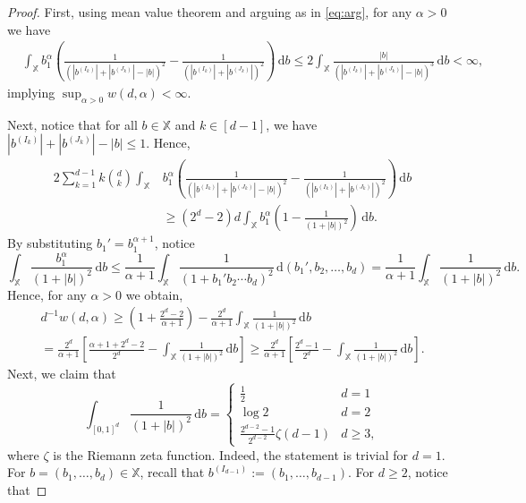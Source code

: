\documentclass[11pt,reqno]{amsart}
\numberwithin{equation}{section}
\theoremstyle{definition}
\newcommand{\XX}{\mathbb{X}}
\newcommand{\diff}{{\,\mathrm d}}
\begin{document}
\begin{proof} First, using mean value theorem and arguing as in \eqref{eq:arg}, for any $\alpha>0$ we have
	\begin{align*}
		&\int_{\XX } b_1^{\alpha} \left(\frac{1}{(|b^{(I_k)}| + |b^{(J_k)}|-|b|)^{2}}  - \frac{1}{(|b^{(I_k)}| + |b^{(J_k)}|)^{2}}\right)\diff b \le 2 \int_{\XX }\frac{|b|}{(|b^{(I_k)}| + |b^{(J_k)}|-|b|)^{3}}\diff b <\infty,
	\end{align*}
	implying $\sup_{\alpha>0} w(d,\alpha)<\infty.$
	
	Next, notice that for all $b \in \XX$ and $k \in [d-1]$, we have $|b^{(I_k)}| + |b^{(J_k)}|-|b| \le 1$. Hence, 
	\begin{align*}
		2\sum_{k=1}^{d-1} k\binom{d}{k}\int_{\XX } & b_1^{\alpha} \left(\frac{1}{(|b^{(I_k)}| + |b^{(J_k)}|-|b|)^{2}}  - \frac{1}{(|b^{(I_k)}| + |b^{(J_k)}|)^{2}}\right)\diff b\\
		&\ge (2^d-2) d \int_{\XX }b_1^{\alpha} \left(1  - \frac{1}{(1+|b|)^{2}}\right)\diff b.
	\end{align*}
By substituting $b_1'=b_1^{\alpha +1}$, notice 
	$$
	\int_{\XX} \frac{b_1^{\alpha}}{(1+|b|)^{2}} \diff b \le \frac{1}{\alpha+1} \int_{\XX} \frac{1}{(1+b_1' b_2 \cdots b_d)^{2}} \diff (b_1',b_2,\dots,b_d)=	\frac{1}{\alpha+1}\int_{\XX} \frac{1}{(1+|b|)^{2}} \diff b.
	$$
	Hence, for any $\alpha>0$ we obtain,
	\begin{multline}\label{eq:sim}
		d^{-1}w(d,\alpha) \ge \left(1 + \frac{2^d-2}{\alpha+1}\right) - \frac{2^d}{\alpha+1} \int_{\XX} \frac{1}{(1+|b|)^2} \diff b \\
= \frac{2^d}{\alpha+1} \left[ \frac{\alpha +1+2^d-2}{2^d} - \int_{\XX} \frac{1}{(1+|b|)^2} \diff b\right]
 \ge \frac{2^d}{\alpha+1} \left[ \frac{2^d-1}{2^d} - \int_{\XX} \frac{1}{(1+|b|)^2} \diff b\right].
	\end{multline}
	Next, we claim that
	\begin{equation}\label{eq:sqint}
		\int_{[0,1]^d} \frac{1}{(1+|b|)^2} \diff b = \left\{
		\begin{array}{cc}
			\frac{1}{2} & d=1 \\
			\log 2 & d=2\\
			\frac{2^{d-2} -1}{2^{d-2}} \zeta(d-1) & d \ge 3,
		\end{array}
		\right.
	\end{equation}
	where $\zeta$ is the Riemann zeta function. Indeed, the statement is trivial for $d=1$. For $b=(b_1,\dots,b_d) \in \XX$, recall that $b^{(I_{d-1})}:=(b_1,\dots,b_{d-1})$. For $d \ge 2$, notice that

\end{proof}
\end{document}
